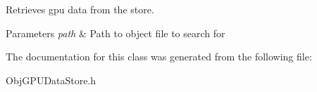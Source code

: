 Retrieves gpu data from the store. 


\begin{DoxyParams}{Parameters}
{\em path} & Path to object file to search for \\
\hline
\end{DoxyParams}


The documentation for this class was generated from the following file\+:\begin{DoxyCompactItemize}
\item 
Obj\+G\+P\+U\+Data\+Store.\+h\end{DoxyCompactItemize}
